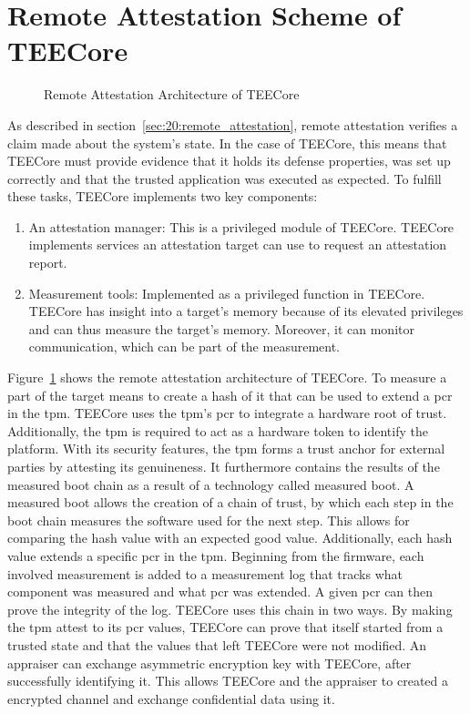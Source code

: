 \section{Remote Attestation Scheme of TEECore}
\label{sec:30:tee_ra_scheme}
\begin{figure}
  \begin{center}
    
    \caption{Remote Attestation Architecture of TEECore}
    \label{fig:30:tee_ra}
  \end{center}
\end{figure}
As described in section~\ref{sec:20:remote_attestation}, remote attestation
verifies a claim made about the system's state. In the case of TEECore, this
means that TEECore must provide evidence that it holds its defense properties,
was set up correctly and that the trusted application was executed as expected.
To fulfill these tasks, TEECore implements two key components:
\begin{enumerate}
  \item An attestation manager: This is a privileged module of
    TEECore. TEECore implements services an attestation target can use to
    request an attestation report.
  \item Measurement tools: Implemented as a privileged function in TEECore.
    TEECore has insight into a target's memory because of its elevated
    privileges and can thus measure the target's memory. Moreover, it can
    monitor communication, which can be part of the measurement.
\end{enumerate}

Figure~\ref{fig:30:tee_ra} shows the remote attestation architecture of TEECore.
To measure a part of the target means to create a hash of it that can be used to
extend a \gls{pcr} in the \gls{tpm}. TEECore uses the \gls{tpm}'s \gls{pcr} to
integrate a hardware root of trust. Additionally, the \gls{tpm} is required to
act as a hardware token to identify the platform. With its security features,
the \gls{tpm} forms a trust anchor for external parties by attesting its
genuineness. It furthermore contains the results of the measured boot chain as a
result of a technology called measured boot. A measured boot allows the creation
of a chain of trust, by which each step in the boot chain measures the software
used for the next step. This allows for comparing the hash value with an
expected good value. Additionally, each hash value extends a specific \gls{pcr}
in the \gls{tpm}. Beginning from the firmware, each involved measurement is
added to a measurement log that tracks what component was measured and what
\gls{pcr} was extended. A given \gls{pcr} can then prove the integrity of the
log. TEECore uses this chain in two ways. By making the \gls{tpm} attest to its
\gls{pcr} values, TEECore can prove that itself started from a trusted state and
that the values that left TEECore were not modified. An appraiser can exchange
asymmetric encryption key with TEECore, after successfully identifying it. This
allows TEECore and the appraiser to created a encrypted channel and exchange
confidential data using it.\\

